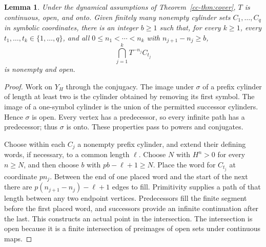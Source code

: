 \documentclass[11pt,reqno]{amsart}
\numberwithin{equation}{section}
\newtheorem{lemma}[theorem]{Lemma}
\theoremstyle{definition}
\begin{document}
\begin{lemma}\label{cc-lem:glue}
Under the dynamical assumptions of Theorem~\ref{cc-thm:cover}, $T$ is
continuous, open, and onto. Given finitely many nonempty cylinder sets
$C_1,\ldots,C_q$ in symbolic coordinates, there is an integer $b\ge1$
such that, for every $k\ge1$, every $t_1,\ldots,t_k\in\{1,\ldots,q\}$,
and all $0\le n_1<\cdots<n_k$ with $n_{j+1}-n_j\ge b$,
\[
 \bigcap_{j=1}^k T^{-n_j}C_{t_j}
\]
is nonempty and open.
\end{lemma}
\begin{proof}
Work on $Y_H$ through the conjugacy. The image under $\sigma$ of a
prefix cylinder of length at least two is the cylinder obtained by
removing its first symbol. The image of a one-symbol cylinder is the
union of the permitted successor cylinders. Hence $\sigma$ is open.
Every vertex has a predecessor, so every infinite path has a predecessor;
thus $\sigma$ is onto. These properties pass to powers and conjugates.

Choose within each $C_j$ a nonempty prefix cylinder, and extend their
defining words, if necessary, to a common length $\ell$. Choose $N$ with
$H^n>0$ for every $n\ge N$, and then choose $b$ with
$pb-\ell+1\ge N$. Place the word for $C_{t_j}$ at coordinate $pn_j$.
Between the end of one placed word and the start of the next there are
$p(n_{j+1}-n_j)-\ell+1$ edges to fill. Primitivity supplies a path of
that length between any two endpoint vertices. Predecessors fill the
finite segment before the first placed word, and successors provide an
infinite continuation after the last. This constructs an actual point
in the intersection. The intersection is open because it is a finite
intersection of preimages of open sets under continuous maps.
\end{proof}
\end{document}
